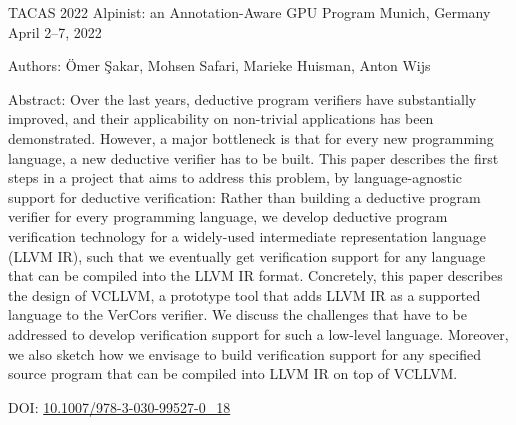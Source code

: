 
\begin{cventries}
	
	
	\cventry
	{TACAS 2022} %
	{Alpinist: an Annotation-Aware GPU Program} %
	{ Munich, Germany} %
	{April 2–7, 2022} %
	{
		\begin{cvitems} %
			\item Authors: \"Omer \c{S}akar, Mohsen Safari, Marieke Huisman, Anton Wijs
			\item Abstract: Over the last years, deductive program verifiers have substantially improved, and their applicability on non-trivial applications has been demonstrated. However, a major bottleneck is that for every new programming language, a new deductive verifier has to be built. This paper describes the first steps in a project that aims to address this problem, by language-agnostic support for deductive verification: Rather than building a deductive program verifier for every programming language, we develop deductive program verification technology for a widely-used intermediate representation language (LLVM IR), such that we eventually get verification support for any language that can be compiled into the LLVM IR format. Concretely, this paper describes the design of VCLLVM, a prototype tool that adds LLVM IR as a supported language to the VerCors verifier. We discuss the challenges that have to be addressed to develop verification support for such a low-level language. Moreover, we also sketch how we envisage to build verification support for any specified source program that can be compiled into LLVM IR on top of VCLLVM.
			\item DOI: \href{https://doi.org/10.1007/978-3-030-99527-0_18}{10.1007/978-3-030-99527-0\_18}
\			
		\end{cvitems}
	}
	

\end{cventries}
